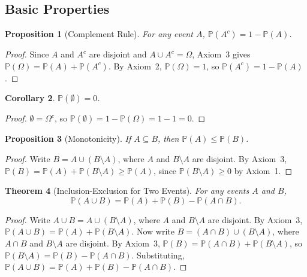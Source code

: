 \documentclass[11pt,a4paper]{article}
\theoremstyle{definition}
\theoremstyle{plain}
\newtheorem{theorem}{Theorem}[section]
\newtheorem{proposition}[theorem]{Proposition}
\newtheorem{corollary}[theorem]{Corollary}
\theoremstyle{remark}
\newcommand{\Prob}{\mathbb{P}}
\begin{document}
\subsection{Basic Properties}

\begin{proposition}[Complement Rule]
\label{prop:complement}
For any event $A$, $\Prob(A^c) = 1 - \Prob(A)$.
\end{proposition}

\begin{proof}
Since $A$ and $A^c$ are disjoint and $A \cup A^c = \Omega$, Axiom~3 gives
$\Prob(\Omega) = \Prob(A) + \Prob(A^c)$. By Axiom~2, $\Prob(\Omega) = 1$, so
$\Prob(A^c) = 1 - \Prob(A)$.
\end{proof}

\begin{corollary}
$\Prob(\emptyset) = 0$.
\end{corollary}

\begin{proof}
$\emptyset = \Omega^c$, so $\Prob(\emptyset) = 1 - \Prob(\Omega) = 1 - 1 = 0$.
\end{proof}

\begin{proposition}[Monotonicity]
\label{prop:monotonicity}
If $A \subseteq B$, then $\Prob(A) \leq \Prob(B)$.
\end{proposition}

\begin{proof}
Write $B = A \cup (B \setminus A)$, where $A$ and $B \setminus A$ are disjoint. By
Axiom~3, $\Prob(B) = \Prob(A) + \Prob(B \setminus A) \geq \Prob(A)$, since
$\Prob(B \setminus A) \geq 0$ by Axiom~1.
\end{proof}

\begin{theorem}[Inclusion-Exclusion for Two Events]
\label{thm:incl_excl_two}
For any events $A$ and $B$,
\[
    \Prob(A \cup B) = \Prob(A) + \Prob(B) - \Prob(A \cap B).
\]
\end{theorem}

\begin{proof}
Write $A \cup B = A \cup (B \setminus A)$, where $A$ and $B \setminus A$ are disjoint.
By Axiom~3, $\Prob(A \cup B) = \Prob(A) + \Prob(B \setminus A)$. Now write
$B = (A \cap B) \cup (B \setminus A)$, where $A \cap B$ and $B \setminus A$ are disjoint.
By Axiom~3, $\Prob(B) = \Prob(A \cap B) + \Prob(B \setminus A)$, so
$\Prob(B \setminus A) = \Prob(B) - \Prob(A \cap B)$. Substituting,
$\Prob(A \cup B) = \Prob(A) + \Prob(B) - \Prob(A \cap B)$.
\end{proof}
\end{document}
